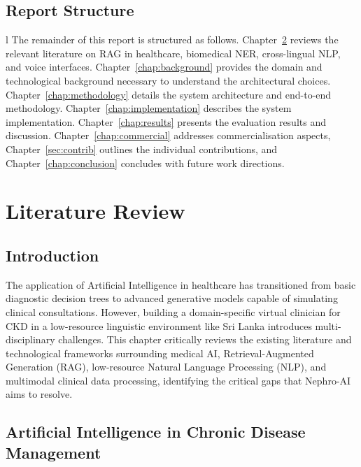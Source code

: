 \documentclass[12pt,a4paper]{report}
\begin{document}
\section{Report Structure}
\label{sec:structure}
l
The remainder of this report is structured as follows. Chapter~\ref{chap:litreview} reviews the relevant literature on RAG in healthcare, biomedical NER, cross-lingual NLP, and voice interfaces. Chapter~\ref{chap:background} provides the domain and technological background necessary to understand the architectural choices. Chapter~\ref{chap:methodology} details the system architecture and end-to-end methodology. Chapter~\ref{chap:implementation} describes the system implementation. Chapter~\ref{chap:results} presents the evaluation results and discussion. Chapter~\ref{chap:commercial} addresses commercialisation aspects, Chapter~\ref{sec:contrib} outlines the individual contributions, and Chapter~\ref{chap:conclusion} concludes with future work directions.

\chapter{Literature Review}
\label{chap:litreview}

\section{Introduction}

The application of Artificial Intelligence in healthcare has transitioned from basic diagnostic decision trees to advanced generative models capable of simulating clinical consultations. However, building a domain-specific virtual clinician for CKD in a low-resource linguistic environment like Sri Lanka introduces multi-disciplinary challenges. This chapter critically reviews the existing literature and technological frameworks surrounding medical AI, Retrieval-Augmented Generation (RAG), low-resource Natural Language Processing (NLP), and multimodal clinical data processing, identifying the critical gaps that Nephro-AI aims to resolve.

\section{Artificial Intelligence in Chronic Disease Management}
\end{document}

